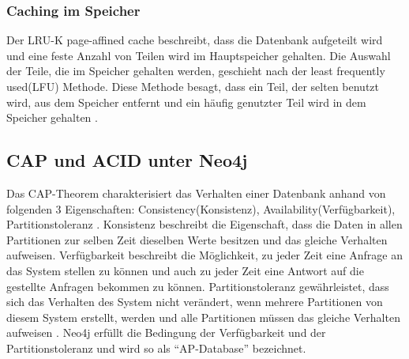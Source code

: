 \subsubsection{Caching im Speicher}
Der LRU-K page-affined cache beschreibt, dass die Datenbank aufgeteilt wird und eine feste Anzahl von Teilen wird im Hauptspeicher gehalten. Die Auswahl der Teile, die im Speicher gehalten werden, geschieht nach der least frequently used(LFU) Methode. Diese Methode besagt, dass ein Teil, der selten benutzt wird, aus dem Speicher entfernt und ein häufig genutzter Teil wird in dem Speicher gehalten \parencite{robinson2013graph}.
\subsection{CAP und ACID unter Neo4j}
Das CAP-Theorem charakterisiert  das Verhalten einer Datenbank anhand von folgenden 3 Eigenschaften: Consistency(Konsistenz), Availability(Verfügbarkeit), Partitionstoleranz \parencite{simon2000brewer}. Konsistenz beschreibt die Eigenschaft, dass die Daten in allen Partitionen zur selben Zeit dieselben Werte besitzen und das gleiche Verhalten aufweisen. Verfügbarkeit beschreibt die Möglichkeit, zu jeder Zeit eine Anfrage an das System stellen zu können und auch zu jeder Zeit eine Antwort auf die gestellte Anfragen bekommen zu können. Partitionstoleranz gewährleistet, dass sich das Verhalten des System nicht verändert, wenn mehrere Partitionen von diesem System erstellt, werden und alle Partitionen müssen das gleiche Verhalten aufweisen  \parencite{simon2000brewer}. Neo4j erfüllt die Bedingung der Verfügbarkeit und der  Partitionstoleranz \parencite{vukotic2015neo4j} und wird so als “AP-Database” bezeichnet. \newline
